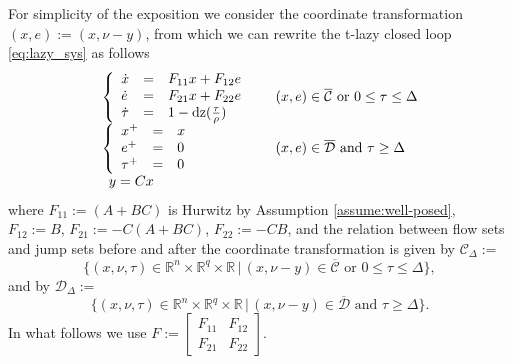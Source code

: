 \documentclass[twocolumn]{autart}
\newcommand{\realn}{\real^n}
\newcommand\real{\ensuremath{{\mathbb R}}}
\newcommand{\smallmat}[1]{\left[ \begin{smallmatrix}#1
    \end{smallmatrix} \right]}
\newcommand\dz{\mathrm{dz}}
\begin{document}
For simplicity of the exposition
we consider the coordinate transformation $(x,e) :=(x,\nu-y)$,
from which we can rewrite the t-lazy closed loop \eqref{eq:lazy_sys} 
as follows
\begin{equation}
\label{eq:elazy_sys}
\begin{array}{ll}
	 \left\{ \begin{array}{lll}
	 \dot{x} & = & F_{11}x + F_{12}e  \\
  	 \dot{e} & = & F_{21}x  +F_{22}e \\
	 \dot{\tau} &=& 1-\dz(\frac{\tau}{\rho}) \\
	 \end{array}\right. \hspace{2mm}  &
	 \;(x,e)\in \overline{\mathcal{C}} \mbox{ or }   0 \leq \tau \leq \Delta \\
	 \left\{\begin{array}{lll}
	 {x}^+ & = & x \\
	 {e}^+ & = & 0\\ 
	 {\tau}^+ & = & 0\\ 
	 \end{array} \right. \hspace{16mm} & 
         \;(x,e) \in \overline{\mathcal{D}} \mbox{ and }  \tau \geq \Delta \\
	 \begin{array}{lll}
		y = Cx  \hspace{16mm} & &  \\
	 \end{array} &
 \end{array}
\end{equation}
where
$F_{11} := (A+BC)$ is Hurwitz by Assumption \ref{assume:well-posed}, 
$F_{12} := B$,
$F_{21} :=-C(A+BC)$,
$F_{22} :=-CB$,
and the relation between flow sets and jump sets before and after the coordinate transformation 
is given by $\mathcal{C}_\Delta :=$
\begin{equation}
\{(x,\nu,\tau) \in \realn \!\times\! \real^q \!\times\! \real \,|\, 
(x,\nu-y)\in \overline{\mathcal{C}} \mbox{ or } 0 \leq \tau \leq \Delta \},
\end{equation}
and by $\mathcal{D}_\Delta :=$
\begin{equation}
\{(x,\nu,\tau) \in \realn \!\times\! \real^q \!\times\! \real \,|\, 
(x,\nu-y)\in \overline{\mathcal{D}} \mbox{ and } \tau \geq \Delta \}.
\end{equation}
In what follows we use $F:=\smallmat{ F_{11} & F_{12}  \\ F_{21} & F_{22}}$.  
\end{document}
